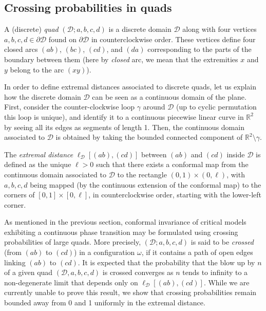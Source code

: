 \documentclass[a4paper,oneside,11pt]{article}
\numberwithin{equation}{section}
\numberwithin{equation}{section}
\numberwithin{equation}{section}
\newcommand{\calD}{\mathcal{D}}
\begin{document}
\subsection{Crossing probabilities in quads}\label{sec:crossing_applications}

 A (discrete) {\em quad} $(\calD; a,b,c,d)$ is a discrete domain $\calD$ along with four vertices $a,b,c,d\in\partial \calD$ found on $\partial \calD$ in counterclockwise order. These vertices define four closed arcs $(ab)$, $(bc)$, $(cd)$, and $(da)$ corresponding to the parts of the boundary between them (here by \emph{closed} arc, we mean that the extremities $x$ and  $y$ belong to the arc $(xy)$).

 In order to define extremal distances associated to discrete quads, let us explain how the discrete domain $\calD$ can be seen as a continuous domain of the plane. First, consider the counter-clockwise loop $\gamma$ around $\mathcal D$ (up to cyclic permutation this loop is unique), and identify it  to a continuous piecewise linear curve in $\mathbb R^2$ by seeing all its edges as segments of length 1. Then, the  continuous domain associated to $\mathcal D$ is  obtained by taking the bounded connected component of $\mathbb R^2\setminus \gamma$.


 The \emph{extremal distance} $\ell_{\calD}\left[\left(ab\right),\left(cd\right)\right]$ between $\left(ab\right)$ and $\left(cd\right)$ inside $\calD$ is defined as the unique $\ell > 0$ such that there exists a conformal map from the continuous domain associated to $\mathcal D$  to the rectangle $(0,1) \times (0,\ell)$, with $a,b,c,d$ being mapped (by the continuous extension of the conformal map) to the corners of $[0,1] \times [0,\ell]$, in counterclockwise order, starting with the lower-left corner.


As mentioned in the previous section, conformal invariance of critical models exhibiting a continuous phase transition may be formulated using crossing probabilities of large quads. More precisely, $(\calD; a,b,c,d)$ is said to be {\em crossed} (from $(ab)$ to $(cd)$) in a configuration $\omega$, if it contains a path of open edges linking $(ab)$ to $(cd)$. It is expected that the probability that the blow up by $n$ of a given quad $(\calD,a,b,c,d)$ is crossed
converges as $n$ tends to infinity to a  non-degenerate limit that depends only on $\ell_{\calD}\left[\left(ab\right),\left(cd\right)\right]$.
 While we are currently unable to prove this result, we show that crossing probabilities remain bounded away from 0 and 1 uniformly in the extremal distance. 
\end{document}
